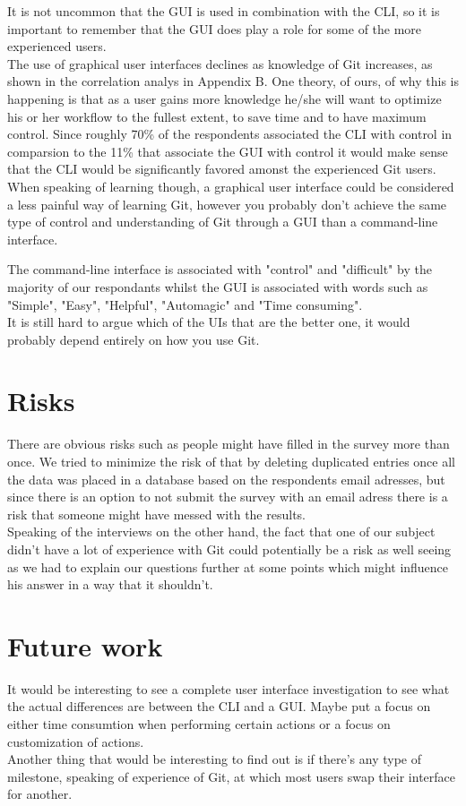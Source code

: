 \documentclass[a4paper,oneside]{bth} %
\begin{document}
		It is not uncommon that the GUI is used in combination with the CLI, so it is important to remember that the GUI does play a role for some of the more experienced users.\\
		The use of graphical user interfaces declines as knowledge of Git increases, as shown in the correlation analys in Appendix B.
		One theory, of ours, of why this is happening is that as a user gains more knowledge he/she will want to optimize his or her workflow to the fullest extent, to save time and to have maximum control. Since roughly 70\% of the respondents associated the CLI with control in comparsion to the 11\% that associate the GUI with control it would make sense that the CLI would be significantly favored amonst the experienced Git users.\\
		When speaking of learning though, a graphical user interface could be considered a less painful way of learning Git, however you probably don't achieve the same type of control and understanding of Git through a GUI than a command-line interface.
		
		The command-line interface is associated with "control" and "difficult" by the majority of our respondants whilst the GUI is associated with words such as "Simple", "Easy", "Helpful", "Automagic" and "Time consuming".\\
		It is still hard to argue which of the UIs that are the better one, it would probably depend entirely on how you use Git.\\
		
		
		\chapter{Risks}
		There are obvious risks such as people might have filled in the survey more than once. We tried to minimize the risk of that by deleting duplicated entries once all the data was placed in a database based on the respondents email adresses, but since there is an option to not submit the survey with an email adress there is a risk that someone might have messed with the results.\\
		Speaking of the interviews on the other hand, the fact that one of our subject didn't have a lot of experience with Git could potentially be a risk as well seeing as we had to explain our questions further at some points which might influence his answer in a way that it shouldn't.
		
		\chapter{Future work}
		It would be interesting to see a complete user interface investigation to see what the actual differences are between the CLI and a GUI. Maybe put a focus on either time consumtion when performing certain actions or a focus on customization of actions.\\
		Another thing that would be interesting to find out is if there's any type of milestone, speaking of experience of Git, at which most users swap their interface for another.
		
\end{document}
